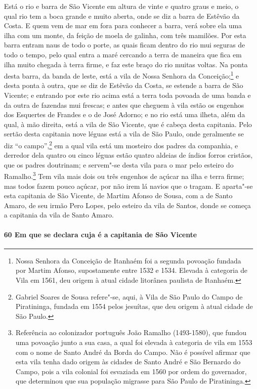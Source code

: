Está o rio e barra de São Vicente em altura de vinte e quatro graus e meio, o qual rio tem
a boca grande e muito aberta, onde se diz a barra de Estêvão da Costa. E quem vem de mar
em fora para conhecer a barra, verá sobre ela uma ilha com um monte, da feição de moela de
galinha, com três mamilões. Por esta barra entram naus de todo o porte, as quais ficam
dentro do rio mui seguras de todo o tempo, pelo qual entra a maré cercando a terra de
maneira que fica em ilha muito chegada à terra firme, e faz este braço do rio muitas
voltas. Na ponta desta barra, da banda de leste, está a vila de Nossa Senhora da
Conceição;\footnote{ Nossa Senhora da Conceição de Itanhaém foi a segunda povoação fundada
por Martim Afonso, supostamente entre 1532 e 1534. Elevada à categoria de Vila em 1561,
deu origem à atual cidade litorânea paulista de Itanhaém.} e desta ponta à outra, que se
diz de Estêvão da Costa, se estende a barra de São Vicente; e entrando por este rio acima
está a terra toda povoada de uma banda e da outra de fazendas mui frescas; e antes que
cheguem à vila estão os engenhos dos Esquertes de Frandes e o de José Adorno; e no rio
está uma ilheta, além da qual, à mão direita, está a vila de São Vicente, que é cabeça
desta capitania. Pelo sertão desta capitania nove léguas está a vila de São Paulo, onde
geralmente se diz ``o campo'',\footnote{ Gabriel Soares de Sousa refere"-se, aqui, à Vila de
São Paulo do Campo de Piratininga, fundada em 1554 pelos jesuítas, que deu origem à atual
cidade de São Paulo.} em a qual vila está um mosteiro dos padres da companhia, e derredor
dela quatro ou cinco léguas estão quatro aldeias de índios forros cristãos, que os padres
doutrinam; e servem"-se desta vila para o mar pelo esteiro do Ramalho.\footnote{ Referência
ao colonizador português João Ramalho (1493-1580), que fundou uma povoação junto a sua
casa, a qual foi elevada à categoria de vila em 1553 com o nome de Santo André da Borda do
Campo. Não é possível afirmar que esta vila tenha dado origem às cidades de Santo André e
São Bernardo do Campo, pois a vila colonial foi esvaziada em 1560 por ordem do
governador, que determinou que sua população migrasse para São Paulo de Piratininga.}
Tem vila mais dois ou três engenhos de açúcar na ilha e terra firme; mas todos fazem pouco
açúcar, por não irem lá navios que o tragam. E aparta"-se esta capitania de São Vicente, de
Martim Afonso de Sousa, com a de Santo Amaro, de seu irmão Pero Lopes, pelo esteiro da
vila de Santos, donde se começa a capitania da vila de Santo Amaro.

\paragraph{60 Em que se declara cuja é a capitania de São Vicente}

